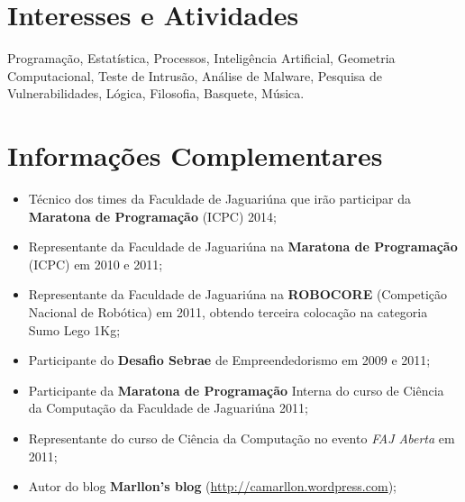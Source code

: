 \documentclass[a4paper,10pt]{article} %
\begin{document}

\section{Interesses e Atividades}

Programação, Estatística, Processos, Inteligência Artificial, Geometria Computacional, Teste de Intrusão, Análise de Malware, Pesquisa de Vulnerabilidades, Lógica,  Filosofia, Basquete, Música. %



\section{Informações Complementares}

\begin{itemize}
  \item Técnico dos times da Faculdade de Jaguariúna que irão participar da \textbf{Maratona de Programação} (ICPC) 2014;  
  \item Representante da Faculdade de Jaguariúna na \textbf{Maratona de Programação} (ICPC) em 2010 e 2011;  

  \item Representante da Faculdade de Jaguariúna na \textbf{ROBOCORE} (Competição Nacional de Robótica) em 2011, obtendo terceira colocação na categoria Sumo Lego 1Kg;
  \item Participante do \textbf{Desafio Sebrae} de Empreendedorismo em 2009 e 2011;
  \item Participante da \textbf{Maratona de Programação} Interna do curso de Ciência da Computação da Faculdade de Jaguariúna 2011;
  \item Representante do curso de Ciência da Computação no evento \emph{FAJ Aberta} em 2011;
  \item Autor do blog \textbf{Marllon's blog} (\url{http://camarllon.wordpress.com});
  {\fb}\setmainfont[SmallCapsFont=Fontin SmallCaps]{Fontin-Regular}\\
\end{itemize}

\end{document}
